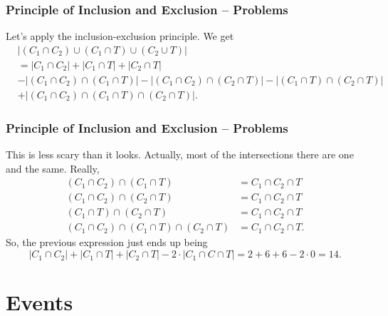 \documentclass[aspectratio=169,11pt,usenames,dvipsnames]{beamer}
\begin{document}
\begin{frame}
 \frametitle{Principle of Inclusion and Exclusion -- Problems}
 Let's apply the inclusion-exclusion principle. We get
 \begin{align*}
  &|(C_1 \cap C_2) \cup (C_1 \cap T) \cup (C_2 \cup T)| \\
  &= |C_1 \cap C_2| + |C_1 \cap T| + |C_2 \cap T| \\
                                                       &- |(C_1 \cap C_2) \cap
                                                       (C_1 \cap T)| - |(C_1
                                                       \cap C_2) \cap (C_2 \cap
                                                       T)| 
                                                       - |(C_1 \cap T) \cap
                                                       (C_2 \cap T)| \\
                                                       &+ |(C_1 \cap C_2) \cap
                                                       (C_1 \cap T) \cap (C_2
                                                       \cap T)|.
 \end{align*}
\end{frame}

\begin{frame}
 \frametitle{Principle of Inclusion and Exclusion -- Problems}
 This is less scary than it looks. Actually, most of the intersections there are
 one and the same. Really,
 \begin{align*}
  (C_1 \cap C_2) \cap (C_1 \cap T) &= C_1 \cap C_2 \cap T \\
  (C_1 \cap C_2) \cap (C_2 \cap T) &= C_1 \cap C_2 \cap T \\
  (C_1 \cap T) \cap (C_2 \cap T) &= C_1 \cap C_2 \cap T \\
  (C_1 \cap C_2) \cap (C_1 \cap T) \cap (C_2 \cap T) &= C_1 \cap C_2 \cap T.
 \end{align*}
 \pause
 So, the previous expression just ends up being
 \[
  |C_1 \cap C_2| + |C_1 \cap T| + |C_2 \cap T| - 2 \cdot |C_1 \cap C \cap T| = 2
  + 6 + 6 - 2 \cdot 0 = 14.
 \]
 
\end{frame}

\section{Events}
\label{sec:events}
\end{document}
